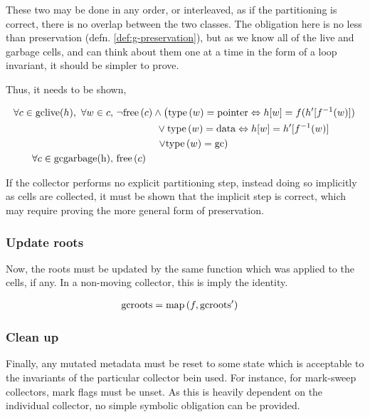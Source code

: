 These two may be done in any order, or interleaved, as if the
partitioning is correct, there is no overlap between the two
classes. The obligation here is no less than preservation
(defn. \ref{def:g-preservation}), but as we know all of the live and
garbage cells, and can think about them one at a time in the form of a
loop invariant, it should be simpler to prove.

Thus, it needs to be shown,

\begin{align*}
  \forall c \in \mathrm{gclive}(h),\ \forall w \in c,\ & \lnot\mathrm{free}\left(c\right) \land 
  \left(\mathrm{type}\left(w\right) = \mathrm{pointer} \Leftrightarrow h[w] =
    f(h'[f^{-1}(w)])\right.\\
  &\quad\quad\quad\quad \lor \mathrm{type}\left(w\right) = \mathrm{data}
  \Leftrightarrow h[w] = h'[f^{-1}(w)]\\
  &\quad\quad\quad\quad \left.\lor \mathrm{type}\left(w\right) =
    \mathrm{gc}\right)\\
  \forall c \in \mathrm{gcgarbage(h)},\ & \mathrm{free}\left(c\right)
\end{align*}

If the collector performs no explicit partitioning step, instead doing
so implicitly as cells are collected, it must be shown that the
implicit step is correct, which may require proving the more general
form of preservation.

\subsubsection{Update roots}
\label{sec:gc-framework-obligations-roots}

Now, the roots must be updated by the same function which was applied
to the cells, if any. In a non-moving collector, this is imply the
identity.

\begin{align*}
  \mathrm{gcroots} &= \mathrm{map}\left(f, \mathrm{gcroots'}\right)
\end{align*}

\subsubsection{Clean up}
\label{sec:gc-framework-obligations-clean}

Finally, any mutated metadata must be reset to some state which is
acceptable to the invariants of the particular collector bein
used. For instance, for mark-sweep collectors, mark flags must be
unset. As this is heavily dependent on the individual collector, no
simple symbolic obligation can be provided.

